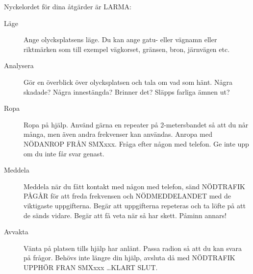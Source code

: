 Nyckelordet för dina åtgärder är LARMA:

\begin{description}
\item[Läge] Ange olycksplatsens läge. Du kan ange gatu- eller vägnamn eller riktmärken som
  till exempel vägkorset, gränsen, bron, järnvägen etc.
\item[Analysera] Gör en överblick över olycksplatsen och tala om vad som hänt.
  Några skadade? Några innestängda? Brinner det? Släpps farliga ämnen ut?
\item[Ropa] Ropa på hjälp. Använd gärna en repeater på 2-metersbandet så att du når många,
  men även andra frekvenser kan användas. Anropa med NÖDANROP FRÅN SMXxxx.
  Fråga efter någon med telefon. Ge inte upp om du inte får svar genast.
\item[Meddela] Meddela när du fått kontakt med någon med telefon, sänd NÖDTRAFIK PÅGÅR
  för att freda frekvensen och NÖDMEDDELANDET med de viktigaste uppgifterna.
  Begär att uppgifterna repeteras och ta löfte på att de sänds vidare.
  Begär att få veta när så har skett. Påminn annars!
\item[Avvakta] Vänta på platsen tills hjälp har anlänt.
  Passa radion så att du kan svara på frågor. Behövs inte längre din hjälp, avsluta då med
  NÖDTRAFIK UPPHÖR FRAN SMXxxx \dots KLART SLUT.
\end{description}
  
